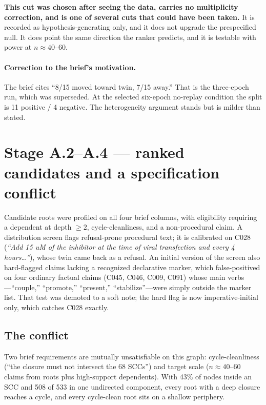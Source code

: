 \documentclass[11pt]{article}
\begin{document}
\textbf{This cut was chosen after seeing the data, carries no multiplicity
correction, and is one of several cuts that could have been taken.} It is
recorded as hypothesis-generating only, and it does not upgrade the prespecified
null. It does point the same direction the ranker predicts, and it is testable
with power at $n\approx40$--$60$.

\paragraph{Correction to the brief's motivation.}
The brief cites ``8/15 moved toward twin, 7/15 away.'' That is the three-epoch
run, which was superseded. At the selected six-epoch no-replay condition the
split is 11 positive / 4 negative. The heterogeneity argument stands but is
milder than stated.

\section{Stage A.2--A.4 --- ranked candidates and a specification conflict}

Candidate roots were profiled on all four brief columns, with eligibility
requiring a dependent at depth $\geq2$, cycle-cleanliness, and a
non-procedural claim. A distribution screen flags refusal-prone procedural text;
it is calibrated on C028 (\emph{``Add 15 uM of the inhibitor at the time of viral
transfection and every 4 hours\ldots''}), whose twin came back as a refusal. An
initial version of the screen also hard-flagged claims lacking a recognized
declarative marker, which false-positived on four ordinary factual claims
(C045, C046, C009, C091) whose main verbs---``couple,'' ``promote,'' ``present,''
``stabilize''---were simply outside the marker list. That test was demoted to a
soft note; the hard flag is now imperative-initial only, which catches C028
exactly.

\subsection{The conflict}

Two brief requirements are mutually unsatisfiable on this graph:
cycle-cleanliness (``the closure must not intersect the 68 SCCs'') and target
scale ($n\approx40$--$60$ claims from roots plus high-support dependents). With
43\% of nodes inside an SCC and 508 of 533 in one undirected component, every
root with a deep closure reaches a cycle, and every cycle-clean root sits on a
shallow periphery.
\end{document}
